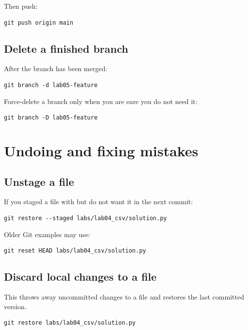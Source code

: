 \documentclass[11pt]{article}
\begin{document}
Then push:

\begin{lstlisting}[style=terminal]
git push origin main
\end{lstlisting}

\subsection{Delete a finished branch}
After the branch has been merged:

\begin{lstlisting}[style=terminal]
git branch -d lab05-feature
\end{lstlisting}

Force-delete a branch only when you are sure you do not need it:

\begin{lstlisting}[style=terminal]
git branch -D lab05-feature
\end{lstlisting}

\section{Undoing and fixing mistakes}

\subsection{Unstage a file}
If you staged a file with  but do not want it in the next commit:

\begin{lstlisting}[style=terminal]
git restore --staged labs/lab04_csv/solution.py
\end{lstlisting}

Older Git examples may use:

\begin{lstlisting}[style=terminal]
git reset HEAD labs/lab04_csv/solution.py
\end{lstlisting}

\subsection{Discard local changes to a file}
This throws away uncommitted changes to a file and restores the last committed version.

\begin{lstlisting}[style=terminal]
git restore labs/lab04_csv/solution.py
\end{lstlisting}
\end{document}
